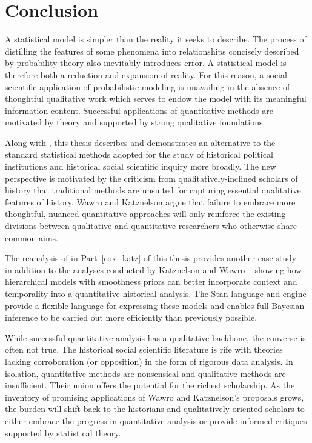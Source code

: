 \chapter{Conclusion}
\label{discussion}

A statistical model is simpler than the reality it seeks to describe. The process of 
distilling the features of some phenomena into relationships concisely described by  
probability theory also inevitably introduces error. A statistical model is therefore both 
a reduction and expansion of reality. For this reason, a social scientific application of 
probabilistic modeling is unavailing in the absence of thoughtful qualitative work which
serves to endow the model with its meaningful information content.
Successful applications of quantitative methods are motivated by theory and supported by 
strong qualitative foundations. 

Along with , this thesis describes and demonstrates 
an alternative to the standard statistical methods adopted for the study of historical 
political institutions and historical social scientific inquiry more broadly. The new perspective is 
motivated by the criticism from qualitatively-inclined scholars of history that traditional methods 
are unsuited for capturing essential qualitative features of history. 
Wawro and Katznelson argue that failure to embrace more thoughtful, nuanced quantitative 
approaches will only reinforce the existing divisions between qualitative and quantitative 
researchers who otherwise share common aims. 

The reanalysis of  in Part~\ref{cox_katz} of this thesis 
provides another case study -- in addition to the analyses conducted by Katznelson and 
Wawro -- showing how hierarchical models with smoothness priors can better incorporate 
context and temporality into a quantitative historical analysis. The Stan language and 
engine provide a flexible language for expressing these models and enables full Bayesian 
inference to be carried out more efficiently than previously possible.  

While successful quantitative analysis has a qualitative backbone, the converse
is often not true. The historical social scientific literature is rife with 
theories lacking corroboration (or opposition) in the form of rigorous 
data analysis. In isolation, quantitative methods are nonsensical and
qualitative methods are insufficient. Their union offers the potential for the richest 
scholarship.  As the inventory of promising applications of Wawro and 
Katznelson's proposals grows, the burden will shift back to the historians and 
qualitatively-oriented scholars to either embrace the progress in quantitative analysis 
or provide informed critiques supported by statistical theory. 

